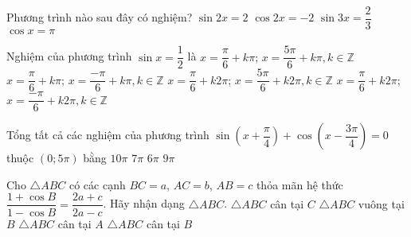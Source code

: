 \begin{ex}%
	Phương trình nào sau đây có nghiệm?
	\choice
	{$\sin2x=2$}
	{$\cos2x=-2$}
	{\True $\sin3x=\dfrac{2}{3}$}
	{$\cos x =\pi$}
\end{ex}
\begin{ex}%
	Nghiệm của phương trình $\sin x=\dfrac{1}{2}$ là
	\choice
	{$x=\dfrac{\pi}{6}+k\pi$; $x=\dfrac{5\pi}{6}+k\pi,k\in\mathbb{Z}$}
	{$x=\dfrac{\pi}{6}+k\pi$; $x=\dfrac{-\pi}{6}+k\pi,k\in\mathbb{Z}$}
	{\True $x=\dfrac{\pi}{6}+k2\pi$; $x=\dfrac{5\pi}{6}+k2\pi,k\in\mathbb{Z}$}
	{$x=\dfrac{\pi}{6}+k2\pi$; $x=\dfrac{-\pi}{6}+k2\pi,k\in\mathbb{Z}$}
\end{ex}
\begin{ex}%
	Tổng tất cả các nghiệm của phương trình $\sin\left(x+\dfrac{\pi}{4}\right)+\cos\left(x-\dfrac{3\pi}{4}\right)=0$ thuộc $\left(0;5\pi\right)$ bằng
	\choice
	{\True $10\pi$}
	{$7\pi$}
	{$6\pi$}
	{$9\pi$}
\end{ex}
\begin{ex}%
    Cho $\triangle ABC$ có các cạnh $BC=a$, $AC=b$, $AB=c$ thỏa mãn hệ thức \break$\dfrac{1+\cos B}{1-\cos B}=\dfrac{2a+c}{2a-c}$. Hãy nhận dạng $\triangle ABC$.
	\choice
	{\True $\triangle ABC$ cân tại $C$}
	{$\triangle ABC$ vuông tại $B$}
	{$\triangle ABC$ cân tại $A$}
	{$\triangle ABC$ cân tại $B$}
\end{ex}
